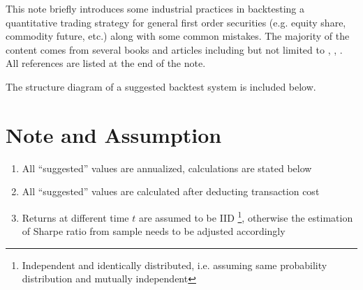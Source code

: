 \documentclass[12pt]{article}
\begin{document}
This note briefly introduces some industrial practices in backtesting a quantitative trading strategy for general first order securities (e.g. equity share, commodity future, etc.) along with some common mistakes. The majority of the content comes from several books and articles including but not limited to \cite{insideblackbox}, \cite{succalgotrading}, \cite{epchan2008}. All references are listed at the end of the note.

The structure diagram of a suggested backtest system is included below.


\newcommand{\suma}{\Large$+$}
\newcommand{\inte}{$\displaystyle \int$}
\newcommand{\derv}{\huge$\frac{d}{dt}$}


\section{Note and Assumption}

\begin{enumerate}
  \item All \enquote{suggested} values are annualized, calculations are stated below
  \item All \enquote{suggested} values are calculated after deducting transaction cost
  \item Returns at different time \(t\) are assumed to be IID \footnote{Independent and identically distributed, i.e. assuming same probability distribution and mutually independent}, otherwise the estimation of Sharpe ratio from sample needs to be adjusted accordingly
\end{enumerate}
\end{document}
